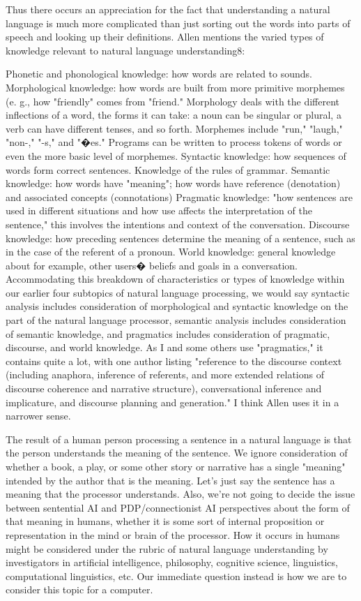 Thus there occurs an appreciation for the fact that understanding a natural language is much more complicated than just sorting out the words into parts of speech and looking up their definitions. Allen mentions the varied types of knowledge relevant to natural language understanding8:

Phonetic and phonological knowledge: how words are related to sounds.
Morphological knowledge: how words are built from more primitive morphemes (e. g., how "friendly" comes from "friend." Morphology deals with the different inflections of a word, the forms it can take: a noun can be singular or plural, a verb can have different tenses, and so forth. Morphemes include "run," "laugh," "non-," "-s," and "�es." Programs can be written to process tokens of words or even the more basic level of morphemes.
Syntactic knowledge: how sequences of words form correct sentences. Knowledge of the rules of grammar.
Semantic knowledge: how words have "meaning"; how words have reference (denotation) and associated concepts (connotations)
Pragmatic knowledge: "how sentences are used in different situations and how use affects the interpretation of the sentence," this involves the intentions and context of the conversation.
Discourse knowledge: how preceding sentences determine the meaning of a sentence, such as in the case of the referent of a pronoun.
World knowledge: general knowledge about for example, other users� beliefs and goals in a conversation.
Accommodating this breakdown of characteristics or types of knowledge within our earlier four subtopics of natural language processing, we would say syntactic analysis includes consideration of morphological and syntactic knowledge on the part of the natural language processor, semantic analysis includes consideration of semantic knowledge, and pragmatics includes consideration of pragmatic, discourse, and world knowledge. As I and some others use "pragmatics," it contains quite a lot, with one author listing "reference to the discourse context (including anaphora, inference of referents, and more extended relations of discourse coherence and narrative structure), conversational inference and implicature, and discourse planning and generation." I think Allen uses it in a narrower sense.

The result of a human person processing a sentence in a natural language is that the person understands the meaning of the sentence. We ignore consideration of whether a book, a play, or some other story or narrative has a single "meaning" intended by the author that is the meaning. Let's just say the sentence has a meaning that the processor understands. Also, we're not going to decide the issue between sentential AI and PDP/connectionist AI perspectives about the form of that meaning in humans, whether it is some sort of internal proposition or representation in the mind or brain of the processor. How it occurs in humans might be considered under the rubric of natural language understanding by investigators in artificial intelligence, philosophy, cognitive science, linguistics, computational linguistics, etc. Our immediate question instead is how we are to consider this topic for a computer.

